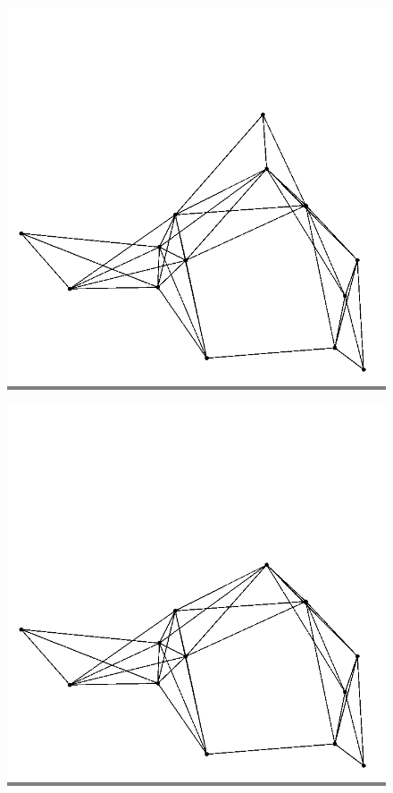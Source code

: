 \documentclass{article}
\begin{document}
\begin{figure}
\begin{minipage}{0.2\textwidth}
            \end{minipage}
            \hspace{\fill}
            \begin{minipage}{0.2\textwidth}
            \colorbox{gray}{\includegraphics[width=\linewidth]{./images/slvo-6.png}}
            \end{minipage}
            \hspace{\fill}
            \begin{minipage}{0.2\textwidth}
            \colorbox{gray}{\includegraphics[width=\linewidth]{./images/slvo-7.png}}

\end{minipage}
\end{figure}
\end{document}
